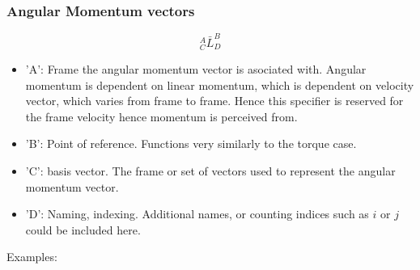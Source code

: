 \documentclass[class=report, 12pt, crop=false]{standalone}
\begin{document}
\begin{center}
\subsubsection{Angular Momentum vectors}
\begin{comment}
\end{comment}
$${}^{A}_{C}\bar{L}^{B}_{D}$$
\begin{itemize}
    \item 'A': Frame the angular momentum vector is asociated with. Angular momentum is dependent on linear momentum, which is dependent on velocity vector, which varies from frame to frame. Hence this specifier is reserved for the frame velocity hence momentum is perceived from.
    \item 'B': Point of reference. Functions very similarly to the torque case.
    \item 'C': basis vector. The frame or set of vectors used to represent the angular momentum vector.
    \item 'D': Naming, indexing. Additional names, or counting indices such as $i$ or $j$ could be included here.
\end{itemize}
Examples:
\subsection{}
\begin{comment}
\end{comment}

\end{center}
\end{document}
